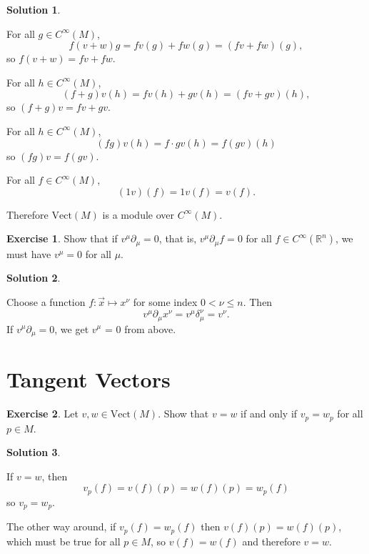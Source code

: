\documentclass[11pt, a4paper]{report}
\theoremstyle{definition}
\newtheorem{ex}{Exercise}[part]
\newtheorem{sol}{Solution}[part]
\renewcommand{\leq}{\leqslant}
\begin{document}
\begin{sol}\label{sol:module}

For all $g \in C^\infty(M)$,
\[
    f(v + w)g = fv(g) + fw(g) = (fv + fw)(g),
\]
so $f(v + w) = fv + fw$.

For all $h \in C^\infty(M)$,
\[
    (f + g)v(h) = fv(h) + gv(h) = (fv + gv)(h),
\]
so $(f + g)v = fv + gv$.


For all $h \in C^\infty(M)$,
\[
    (fg)v(h) = f \cdot gv(h) = f(gv)(h)
\]
so $(fg)v = f(gv)$.

For all $f \in C^\infty(M)$,
\[
    (1v)(f) = 1v(f) = v(f).
\]

Therefore $\text{Vect}(M)$ is a module over $C^\infty(M)$.

\end{sol}

\begin{ex}

Show that if $v^\mu\partial_\mu = 0$, that is, $v^\mu \partial_\mu f = 0$ for all $f \in C^\infty(\mathbb{R}^n)$, we must have $v^\mu = 0$ for all $\mu$.

\end{ex}

\begin{sol}\label{sol:basis}

Choose a function $f: \vec{x} \mapsto x^\nu$ for some index $0 < \nu \leq n$. Then
\[
    v^\mu \partial_\mu x^\nu = v^\mu \delta_\mu^\nu = v^\nu.
\]
If $v^\mu\partial_\mu = 0$, we get $v^\mu$ = 0 from above.

\end{sol}

\section{Tangent Vectors}

\begin{ex}

Let $v, w \in \text{Vect}(M)$. Show that $v = w$ if and only if $v_p = w_p$ for all $p \in M$.

\end{ex}

\begin{sol}\label{sol:tangentvectorpointequality}

If $v = w$, then
\[
    v_p(f) = v(f)(p) = w(f)(p) = w_p(f)
\]
so $v_p = w_p$.

The other way around, if $v_p(f) = w_p(f)$ then $v(f)(p) = w(f)(p)$, which must be true for all $p \in M$, so $v(f) = w(f)$ and therefore $v = w$.

\end{sol}
\end{document}
